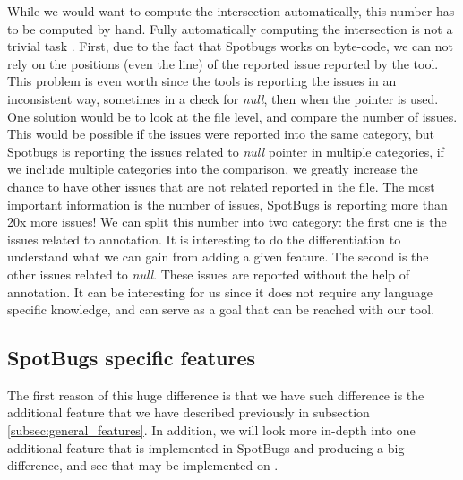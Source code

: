 While we would want to compute the intersection automatically, this number has to be computed by hand. 
Fully automatically computing the intersection is not a trivial task \cite{Gabel:2010:OIE:1806799.1806806}. 
First, due to the fact that Spotbugs works on byte-code, we can not rely on the positions (even the line) of the reported issue reported by the tool. 
This problem is even worth since the tools is reporting the issues in an inconsistent way, sometimes in a check for \emph{null}, then when the pointer is used. 
One solution would be to look at the file level, and compare the number of issues. 
This would be possible if the issues were reported into the same category, but Spotbugs is reporting the issues related to \emph{null} pointer in multiple categories, if we include multiple categories into the comparison, we greatly increase the chance to have other issues that are not related reported in the file. \newline
The most important information is the number of issues, SpotBugs is reporting more than 20x more issues! 
We can split this number into two category: the first one is the issues related to annotation. It is interesting to do the differentiation to understand what we can gain from adding a given feature. 
The second is the other issues related to \emph{null}. 
These issues are reported without the help of annotation. 
It can be interesting for us since it does not require any language specific knowledge, and can serve as a goal that can be reached with our tool.

\subsection{SpotBugs specific features}
\label{subsec:spotbugs_specific}

The first reason of this huge difference is that we have such difference is the additional feature that we have described previously in subsection \ref{subsec:general_features}.
In addition, we will look more in-depth into one additional feature that is implemented in SpotBugs and producing a big difference, and see that may be implemented on \slang{}.

